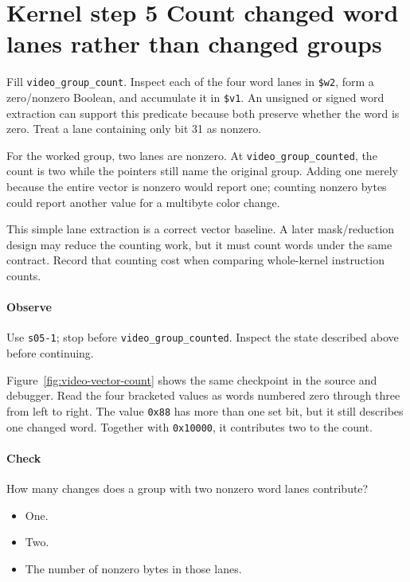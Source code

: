 \section{Kernel step 5 Count changed word lanes rather than changed groups}
Fill \texttt{video\_group\_count}. Inspect each of the four word lanes in \texttt{\$w2}, form a zero/nonzero Boolean, and accumulate it in \texttt{\$v1}. An unsigned or signed word extraction can support this predicate because both preserve whether the word is zero. Treat a lane containing only bit 31 as nonzero.

For the worked group, two lanes are nonzero. At \texttt{video\_group\_counted}, the count is two while the pointers still name the original group. Adding one merely because the entire vector is nonzero would report one; counting nonzero bytes could report another value for a multibyte color change.

This simple lane extraction is a correct vector baseline. A later mask/reduction design may reduce the counting work, but it must count words under the same contract. Record that counting cost when comparing whole-kernel instruction counts.

\paragraph{Observe} Use \texttt{s05-1}; stop before \texttt{video\_group\_counted}. Inspect the state described above before continuing.

Figure~\ref{fig:video-vector-count} shows the same checkpoint in the source and debugger. Read the four bracketed values as words numbered zero through three from left to right. The value \texttt{0x88} has more than one set bit, but it still describes one changed word. Together with \texttt{0x10000}, it contributes two to the count.



\paragraph{Check} How many changes does a group with two nonzero word lanes contribute?
\begin{itemize}
  \item[A.] One.
  \item[B.] Two.
  \item[C.] The number of nonzero bytes in those lanes.
\end{itemize}
